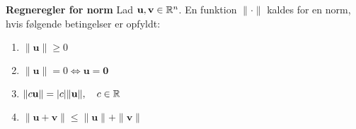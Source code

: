 \begin{thmx}\textbf{Regneregler for norm}\label{sæt:norm2} %
\newline
Lad $\mathbf{u}, \mathbf{v} \in \mathbb{R}^n$. En funktion $\|\cdot\|$ kaldes for en norm, hvis følgende betingelser er opfyldt:
\begin{enumerate}
    \item $\|\mathbf{u}\|\geq 0$\\
    \item $\|\mathbf{u}\|=0 \Leftrightarrow \mathbf{u=0}$\\
    \item $\|c\mathbf{u}\|=|c| \|\mathbf{u}\|, \quad c\in \mathbb{R}$\\
    \item $\|\mathbf{u}+\mathbf{v}\|\leq \|\mathbf{u}\|+\|\mathbf{v}\|$
\end{enumerate}
\end{thmx}

